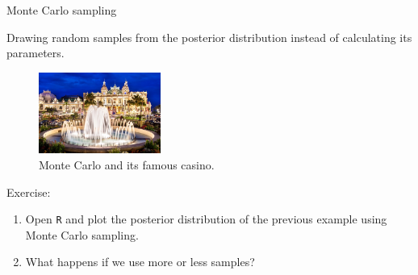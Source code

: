 \begin{frame}{Monte Carlo sampling}

	Drawing random samples from the posterior distribution instead of calculating its parameters.

	\begin{figure}[!ht]
		\centering
		\includegraphics[width=4cm]{Images/MonteCarlo.jpeg}
		\caption{Monte Carlo and its famous casino.}
		\label{Fig:MonteCarlo}
	\end{figure}

	Exercise:\\
	\begin{enumerate}
		\item Open \texttt{R} and plot the posterior distribution of the previous example 
		using Monte Carlo sampling.
		\item What happens if we use more or less samples?
	\end{enumerate}

\end{frame}



